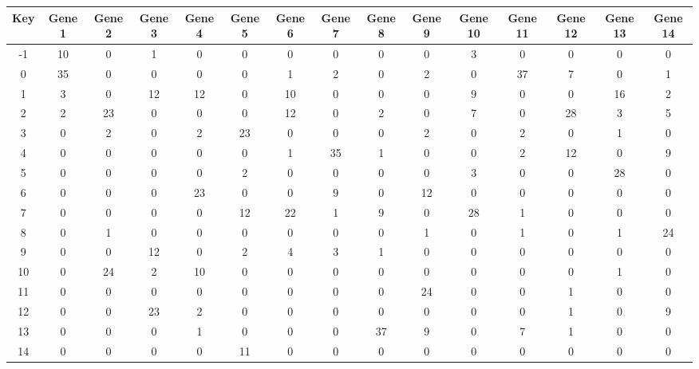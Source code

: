 \begin{tabular}{|c|c|c|c|c|c|c|c|c|c|c|c|c|c|c|}
\hline
Key & Gene 1 & Gene 2 & Gene 3 & Gene 4 & Gene 5 & Gene 6 & Gene 7 & Gene 8 & Gene 9 & Gene 10 & Gene 11 & Gene 12 & Gene 13 & Gene 14 \\
\hline
-1 & 10 & 0 & 1 & 0 & 0 & 0 & 0 & 0 & 0 & 3 & 0 & 0 & 0 & 0 \\
0 & 35 & 0 & 0 & 0 & 0 & 1 & 2 & 0 & 2 & 0 & 37 & 7 & 0 & 1 \\
1 & 3 & 0 & 12 & 12 & 0 & 10 & 0 & 0 & 0 & 9 & 0 & 0 & 16 & 2 \\
2 & 2 & 23 & 0 & 0 & 0 & 12 & 0 & 2 & 0 & 7 & 0 & 28 & 3 & 5 \\
3 & 0 & 2 & 0 & 2 & 23 & 0 & 0 & 0 & 2 & 0 & 2 & 0 & 1 & 0 \\
4 & 0 & 0 & 0 & 0 & 0 & 1 & 35 & 1 & 0 & 0 & 2 & 12 & 0 & 9 \\
5 & 0 & 0 & 0 & 0 & 2 & 0 & 0 & 0 & 0 & 3 & 0 & 0 & 28 & 0 \\
6 & 0 & 0 & 0 & 23 & 0 & 0 & 9 & 0 & 12 & 0 & 0 & 0 & 0 & 0 \\
7 & 0 & 0 & 0 & 0 & 12 & 22 & 1 & 9 & 0 & 28 & 1 & 0 & 0 & 0 \\
8 & 0 & 1 & 0 & 0 & 0 & 0 & 0 & 0 & 1 & 0 & 1 & 0 & 1 & 24 \\
9 & 0 & 0 & 12 & 0 & 2 & 4 & 3 & 1 & 0 & 0 & 0 & 0 & 0 & 0 \\
10 & 0 & 24 & 2 & 10 & 0 & 0 & 0 & 0 & 0 & 0 & 0 & 0 & 1 & 0 \\
11 & 0 & 0 & 0 & 0 & 0 & 0 & 0 & 0 & 24 & 0 & 0 & 1 & 0 & 0 \\
12 & 0 & 0 & 23 & 2 & 0 & 0 & 0 & 0 & 0 & 0 & 0 & 1 & 0 & 9 \\
13 & 0 & 0 & 0 & 1 & 0 & 0 & 0 & 37 & 9 & 0 & 7 & 1 & 0 & 0 \\
14 & 0 & 0 & 0 & 0 & 11 & 0 & 0 & 0 & 0 & 0 & 0 & 0 & 0 & 0 \\
\hline
\end{tabular}